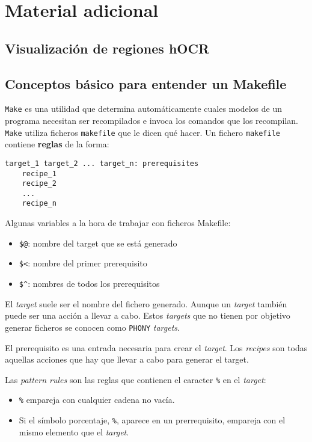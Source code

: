 \chapter{Material adicional}
\label{chap:adicional}

\section{Visualización de regiones hOCR}

\section{Conceptos básico para entender un Makefile}

\texttt{Make} es una utilidad que determina automáticamente cuales modelos de un programa necesitan ser recompilados e invoca los comandos que los recompilan. \texttt{Make} utiliza ficheros \verb|makefile| que le dicen qué hacer. Un fichero \verb|makefile| contiene \textbf{reglas} de la forma:

\begin{verbatim}
target_1 target_2 ... target_n: prerequisites
    recipe_1
    recipe_2
    ...
    recipe_n    
\end{verbatim}

Algunas variables a la hora de trabajar con ficheros Makefile:

\begin{itemize}
    \item \verb|$@|: nombre del target que se está generado
    \item \verb|$<|: nombre del primer prerequisito
    \item \verb|$^|: nombres de todos los prerequisitos
\end{itemize}

El \emph{target} suele ser el nombre del fichero generado. Aunque un \emph{target} también puede ser una acción a llevar a cabo. Estos \emph{targets} que no tienen por objetivo generar ficheros se conocen como \verb|PHONY| \emph{targets}.

El prerequisito es una entrada necesaria para crear el \emph{target}. Los \emph{recipes} son todas aquellas acciones que hay que llevar a cabo para generar el target.

Las \emph{pattern rules} son las reglas que contienen el caracter \verb|%| en el \emph{target}:

\begin{itemize}
    \item \verb|%| empareja con cualquier cadena no vacía.
    \item Si el símbolo porcentaje, \verb|%|, aparece en un prerrequisito, empareja con el mismo elemento que el \emph{target}.
\end{itemize}

